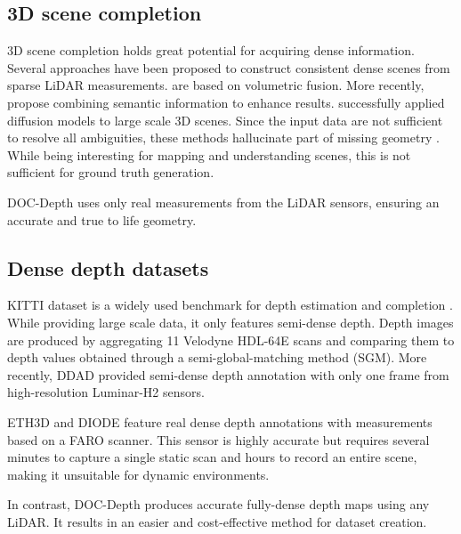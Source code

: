 \subsection{3D scene completion}
3D scene completion holds great potential for acquiring dense information.
Several approaches have been proposed to construct consistent dense scenes from sparse LiDAR measurements. 
\cite{vizzo2022make,dai2020sg,weder2021neuralfusion,murez2020atlas} are based on volumetric fusion. More recently, \cite{cao2024pasco,li2023voxformer,xia2023scpnet} propose combining semantic information to enhance results. \cite{nunes2024cvpr} successfully applied diffusion models to large scale 3D scenes. Since the input data are not sufficient to resolve all ambiguities, these methods hallucinate part of missing geometry \cite{roldao20223d}. While being interesting for mapping and understanding scenes, this is not sufficient for ground truth generation. 

DOC-Depth uses only real measurements from the LiDAR sensors, ensuring an accurate and true to life geometry. 


\subsection{Dense depth datasets}
KITTI dataset \cite{Geiger2012CVPR} is a widely used benchmark for depth estimation and completion \cite{uhrig2017sparsity}. While providing large scale data, it only features semi-dense depth. Depth images are produced by aggregating 11 Velodyne HDL-64E scans and comparing them to depth values obtained through a semi-global-matching method (SGM). More recently, DDAD \cite{packnet} provided semi-dense depth annotation with only one frame from high-resolution Luminar-H2 sensors. 

ETH3D \cite{Schops_2019_CVPR} and DIODE \cite{diode_dataset} feature real dense depth annotations with measurements based on a FARO scanner. This sensor is highly accurate but requires several minutes to capture a single static scan and hours to record an entire scene, making it unsuitable for dynamic environments.

In contrast, DOC-Depth produces accurate fully-dense depth maps using any LiDAR. It results in an easier and cost-effective method for dataset creation.